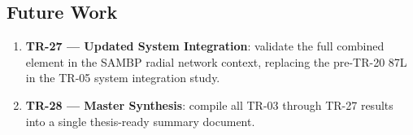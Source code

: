 \documentclass[11pt,a4paper]{article}
\begin{document}
\subsection{Future Work}

\begin{enumerate}
  \item \textbf{TR-27 — Updated System Integration}: validate the full
    combined element in the SAMBP radial network context, replacing the
    pre-TR-20 87L in the TR-05 system integration study.
  \item \textbf{TR-28 — Master Synthesis}: compile all TR-03 through TR-27
    results into a single thesis-ready summary document.
\end{enumerate}



\end{document}
